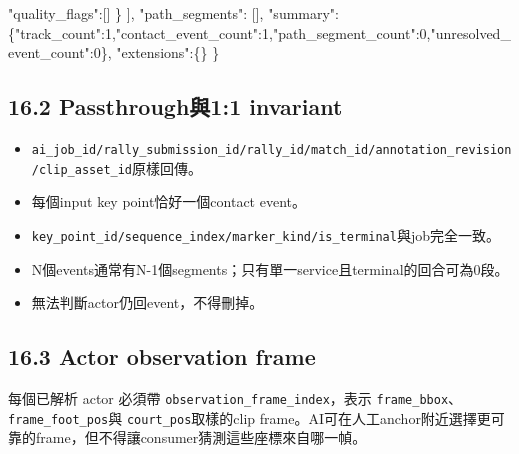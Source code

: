 \documentclass[
  9pt,
  a4paper,
]{article}
\newenvironment{Shaded}{}{}
\newcommand{\DataTypeTok}[1]{\textcolor[rgb]{0.56,0.13,0.00}{#1}}
\newcommand{\DecValTok}[1]{\textcolor[rgb]{0.25,0.63,0.44}{#1}}
\newcommand{\FunctionTok}[1]{\textcolor[rgb]{0.02,0.16,0.49}{#1}}
\newcommand{\OtherTok}[1]{\textcolor[rgb]{0.00,0.44,0.13}{#1}}
\providecommand{\tightlist}{%
  \setlength{\itemsep}{0pt}\setlength{\parskip}{0pt}}
\begin{document}
\begin{Shaded}
\begin{Highlighting}[]
      \DataTypeTok{"quality\_\allowbreak{}flags"}\FunctionTok{:}\OtherTok{[]}
    \FunctionTok{\}}
  \OtherTok{]}\FunctionTok{,}
  \DataTypeTok{"path\_\allowbreak{}segments"}\FunctionTok{:} \OtherTok{[]}\FunctionTok{,}
  \DataTypeTok{"summary"}\FunctionTok{:\{}\DataTypeTok{"track\_\allowbreak{}count"}\FunctionTok{:}\DecValTok{1}\FunctionTok{,}\DataTypeTok{"contact\_\allowbreak{}event\_\allowbreak{}count"}\FunctionTok{:}\DecValTok{1}\FunctionTok{,}\DataTypeTok{"path\_\allowbreak{}segment\_\allowbreak{}count"}\FunctionTok{:}\DecValTok{0}\FunctionTok{,}\DataTypeTok{"unresolved\_\allowbreak{}event\_\allowbreak{}count"}\FunctionTok{:}\DecValTok{0}\FunctionTok{\},}
  \DataTypeTok{"extensions"}\FunctionTok{:\{\}}
\FunctionTok{\}}
\end{Highlighting}
\end{Shaded}

\subsection{16.2 Passthrough與1:1
invariant}\label{162-passthroughux820711-invariant}

\begin{itemize}
\tightlist
\item
  \texttt{ai\_\allowbreak{}job\_\allowbreak{}id/rally\_\allowbreak{}submission\_\allowbreak{}id/rally\_\allowbreak{}id/match\_\allowbreak{}id/annotation\_\allowbreak{}revision/clip\_\allowbreak{}asset\_\allowbreak{}id}原樣回傳。
\item
  每個input key point恰好一個contact event。
\item
  \texttt{key\_\allowbreak{}point\_\allowbreak{}id/sequence\_\allowbreak{}index/marker\_\allowbreak{}kind/is\_\allowbreak{}terminal}與job完全一致。
\item
  N個events通常有N-1個segments；只有單一service且terminal的回合可為0段。
\item
  無法判斷actor仍回event，不得刪掉。
\end{itemize}

\subsection{16.3 Actor observation
frame}\label{163-actor-observation-frame}

每個已解析 actor 必須帶 \texttt{observation\_\allowbreak{}frame\_\allowbreak{}index}，表示
\texttt{frame\_\allowbreak{}bbox}、\texttt{frame\_\allowbreak{}foot\_\allowbreak{}pos}與
\texttt{court\_\allowbreak{}pos}取樣的clip
frame。AI可在人工anchor附近選擇更可靠的frame，但不得讓consumer猜測這些座標來自哪一幀。
\end{document}
